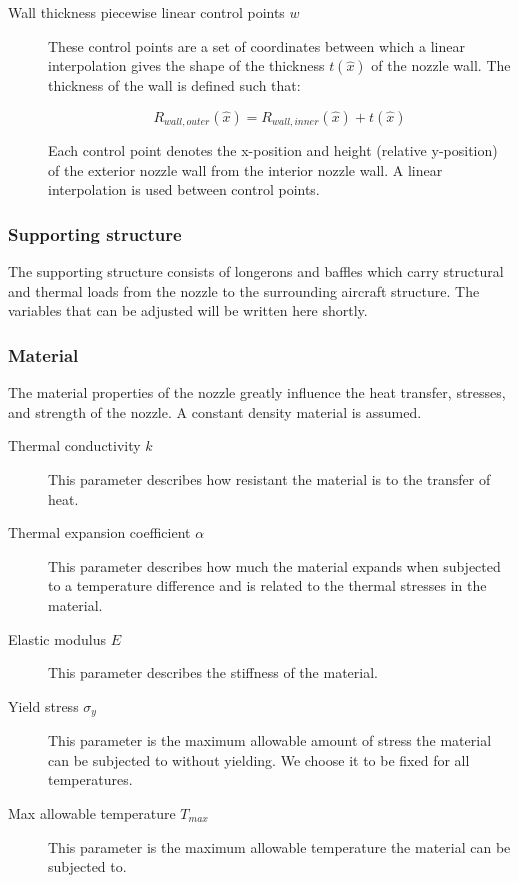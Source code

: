\documentclass{article}
\begin{document}
\begin{description}
\item[Wall thickness piecewise linear control points $w$] These control points are a set of coordinates between which a linear interpolation gives the shape of the thickness $t(\hat x)$ of the nozzle wall. The thickness of the wall is defined such that:

  \begin{equation}
  R_{wall,outer}(\hat x) = R_{wall,inner}(\hat x) + t(\hat x)
  \end{equation}

Each control point denotes the x-position and height (relative y-position) of the exterior nozzle wall from the interior nozzle wall. A linear interpolation is used between control points.
\end{description}

\subsubsection{Supporting structure}
The supporting structure consists of longerons and baffles which carry structural and thermal loads from the nozzle to the surrounding aircraft structure. The variables that can be adjusted will be written here shortly.

\subsubsection{Material}
The material properties of the nozzle greatly influence the heat transfer, stresses, and strength of the nozzle. A constant density material is assumed.
\begin{description}
\item[Thermal conductivity $k$] This parameter describes how resistant the material is to the transfer of heat.
\item[Thermal expansion coefficient $\alpha$] This parameter describes how much the material expands when subjected to a temperature difference and is related to the thermal stresses in the material.
\item[Elastic modulus $E$] This parameter describes the stiffness of the material.
\item[Yield stress $\sigma_{y}$] This parameter is the maximum allowable amount of stress the material can be subjected to without yielding. We choose it to be fixed for all temperatures.
\item[Max allowable temperature $T_{max}$] This parameter is the maximum allowable temperature the material can be subjected to.
\end{description}
\end{document}
